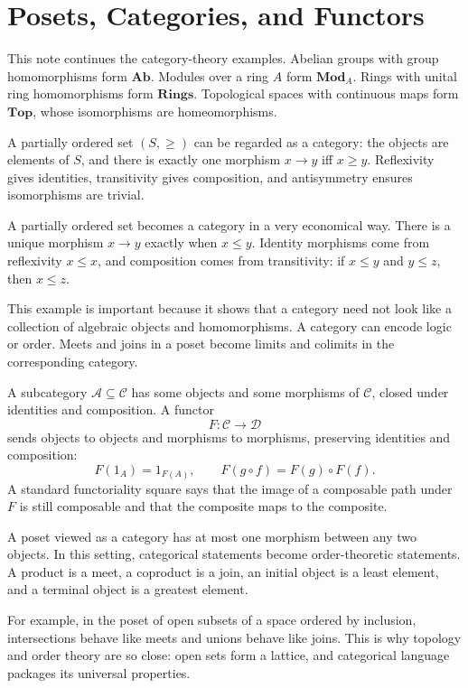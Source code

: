 
\section{Posets, Categories, and Functors}

This note continues the category-theory examples.  Abelian groups with group homomorphisms form \(\mathbf{Ab}\).  Modules over a ring \(A\) form \(\mathbf{Mod}_A\).  Rings with unital ring homomorphisms form \(\mathbf{Rings}\).  Topological spaces with continuous maps form \(\mathbf{Top}\), whose isomorphisms are homeomorphisms.

A partially ordered set \((S,\ge)\) can be regarded as a category: the objects are elements of \(S\), and there is exactly one morphism \(x\to y\) iff \(x\ge y\).  Reflexivity gives identities, transitivity gives composition, and antisymmetry ensures isomorphisms are trivial.

A partially ordered set becomes a category in a very economical way.  There is a unique morphism \(x\to y\) exactly when \(x\le y\).  Identity morphisms come from reflexivity \(x\le x\), and composition comes from transitivity: if \(x\le y\) and \(y\le z\), then \(x\le z\).

This example is important because it shows that a category need not look like a collection of algebraic objects and homomorphisms.  A category can encode logic or order.  Meets and joins in a poset become limits and colimits in the corresponding category.

A subcategory \(\mathcal A\subseteq\mathcal C\) has some objects and some morphisms of \(\mathcal C\), closed under identities and composition.  A functor
\[
  F:\mathcal C\to\mathcal D
\]
sends objects to objects and morphisms to morphisms, preserving identities and composition:
\[
  F(1_A)=1_{F(A)},\qquad F(g\circ f)=F(g)\circ F(f).
\]
A standard functoriality square says that the image of a composable path under \(F\) is still composable and that the composite maps to the composite.

A poset viewed as a category has at most one morphism between any two objects.  In this setting, categorical statements become order-theoretic statements.  A product is a meet, a coproduct is a join, an initial object is a least element, and a terminal object is a greatest element.

For example, in the poset of open subsets of a space ordered by inclusion, intersections behave like meets and unions behave like joins.  This is why topology and order theory are so close: open sets form a lattice, and categorical language packages its universal properties.


